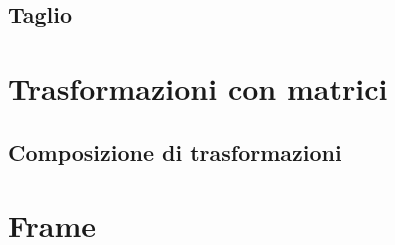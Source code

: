 \subsection{Taglio}

\section{Trasformazioni con matrici}

\subsection{Composizione di trasformazioni}

\section{Frame}
